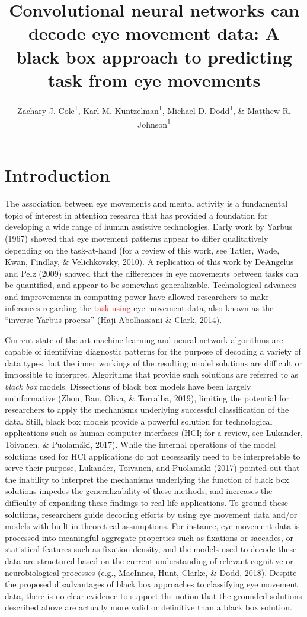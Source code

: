 \documentclass[
  english,
  man, donotrepeattitle,floatsintext]{apa6}
\title{Convolutional neural networks can decode eye movement data: A black box approach to predicting task from eye movements}
\author{Zachary J. Cole\textsuperscript{1}, Karl M. Kuntzelman\textsuperscript{1}, Michael D. Dodd\textsuperscript{1}, \& Matthew R. Johnson\textsuperscript{1}}
\date{}
\affiliation{\vspace{0.5cm}\textsuperscript{1} University of Nebraska-Lincoln}
\begin{document}
\maketitle

\section{Introduction}

The association between eye movements and mental activity is a fundamental topic of interest in attention research that has provided a foundation for developing a wide range of human assistive technologies. Early work by Yarbus (1967) showed that eye movement patterns appear to differ qualitatively depending on the task-at-hand (for a review of this work, see Tatler, Wade, Kwan, Findlay, \& Velichkovsky, 2010). A replication of this work by DeAngelus and Pelz (2009) showed that the differences in eye movements between tasks can be quantified, and appear to be somewhat generalizable. Technological advances and improvements in computing power have allowed researchers to make inferences regarding the \textcolor{red}{task using} eye movement data, also known as the ``inverse Yarbus process'' (Haji-Abolhassani \& Clark, 2014).

Current state-of-the-art machine learning and neural network algorithms are capable of identifying diagnostic patterns for the purpose of decoding a variety of data types, but the inner workings of the resulting model solutions are difficult or impossible to interpret. Algorithms that provide such solutions are referred to as \emph{black box} models. Dissections of black box models have been largely uninformative (Zhou, Bau, Oliva, \& Torralba, 2019), limiting the potential for researchers to apply the mechanisms underlying successful classification of the data. Still, black box models provide a powerful solution for technological applications such as human-computer interfaces (HCI; for a review, see Lukander, Toivanen, \& Puolamäki, 2017). While the internal operations of the model solutions used for HCI applications do not necessarily need to be interpretable to serve their purpose, Lukander, Toivanen, and Puolamäki (2017) pointed out that the inability to interpret the mechanisms underlying the function of black box solutions impedes the generalizability of these methods, and increases the difficulty of expanding these findings to real life applications. To ground these solutions, researchers guide decoding efforts by using eye movement data and/or models with built-in theoretical assumptions. For instance, eye movement data is processed into meaningful aggregate properties such as fixations or saccades, or statistical features such as fixation density, and the models used to decode these data are structured based on the current understanding of relevant cognitive or neurobiological processes (e.g., MacInnes, Hunt, Clarke, \& Dodd, 2018). Despite the proposed disadvantages of black box approaches to classifying eye movement data, there is no clear evidence to support the notion that the grounded solutions described above are actually more valid or definitive than a black box solution.
\end{document}
